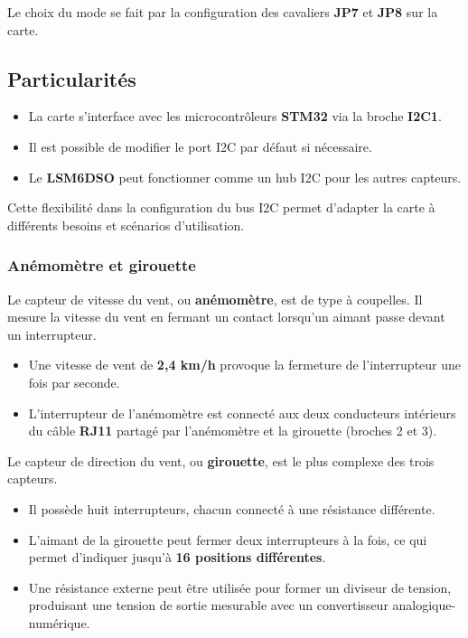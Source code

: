 \documentclass[12pt]{article}
\begin{document}
Le choix du mode se fait par la configuration des cavaliers \textbf{JP7} et \textbf{JP8} sur la carte.

\subsection*{Particularités}

\begin{itemize}
    \item La carte s'interface avec les microcontrôleurs \textbf{STM32} via la broche \textbf{I2C1}.
    \item Il est possible de modifier le port I2C par défaut si nécessaire.
    \item Le \textbf{LSM6DSO} peut fonctionner comme un hub I2C pour les autres capteurs.
\end{itemize}

Cette flexibilité dans la configuration du bus I2C permet d'adapter la carte à différents besoins et scénarios d'utilisation.

\subsubsection{Anémomètre et girouette}
Le capteur de vitesse du vent, ou \textbf{anémomètre}, est de type à coupelles. Il mesure la vitesse du vent en fermant un contact lorsqu'un aimant passe devant un interrupteur. 
\begin{itemize}
    \item Une vitesse de vent de \textbf{2,4 km/h} provoque la fermeture de l'interrupteur une fois par seconde.
    \item L'interrupteur de l'anémomètre est connecté aux deux conducteurs intérieurs du câble \textbf{RJ11} partagé par l'anémomètre et la girouette (broches 2 et 3).
\end{itemize}

Le capteur de direction du vent, ou \textbf{girouette}, est le plus complexe des trois capteurs. 
\begin{itemize}
    \item Il possède huit interrupteurs, chacun connecté à une résistance différente.
    \item L'aimant de la girouette peut fermer deux interrupteurs à la fois, ce qui permet d'indiquer jusqu'à \textbf{16 positions différentes}.
    \item Une résistance externe peut être utilisée pour former un diviseur de tension, produisant une tension de sortie mesurable avec un convertisseur analogique-numérique.
\end{itemize}
\end{document}
